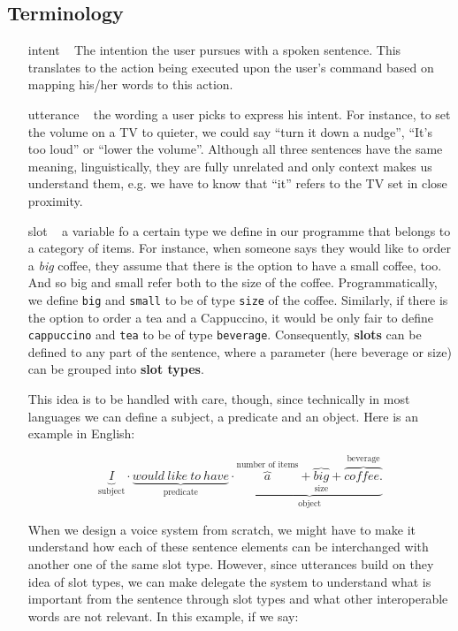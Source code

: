 \subsection{Terminology} 
\begin{itemize}
	\item[intent]~\label{intents} The intention the user pursues with a spoken sentence. This translates to the action being executed upon the user's command based on mapping his/her words to this action.
	
	\item[utterance]~\label{utterances} the wording a user picks to express his intent. For instance, to set the volume on a TV to quieter, we could say ``turn it down a nudge'', ``It's too loud'' or ``lower the volume''. Although all three sentences have the same meaning, linguistically, they are fully unrelated and only context makes us understand them, e.g. we have to know that ``it'' refers to the TV set in close proximity.
	
	\item [slot]~\label{slots} a variable fo a certain type we define in our programme that belongs to a category of items. For instance, when someone says they would like to order a \textit{big} coffee, they assume that there is the option to have a small coffee, too. And so big and small refer both to the size of the coffee. Programmatically, we define \lstinline|big| and \lstinline|small| to be of type \lstinline|size| of the coffee. Similarly, if there is the option to order a tea and a Cappuccino, it would be only fair to define \lstinline|cappuccino| and \lstinline|tea| to be of type \lstinline|beverage|. Consequently, \textbf{slots} can be defined to any part of the sentence, where a parameter (here beverage or size) can be grouped into \textbf{slot types}. 

	
	This idea is to be handled with care, though, since technically in most languages we can define a subject, a predicate and an object. Here is an example in English:
	
	
	\[
	\underbrace{I}_\text{subject} \cdot
	\underbrace{would \ like  \ to \ have}_\text{predicate} \cdot
	\underbrace{
		\overbrace{{a}}^\text{number of items} +		
		\overbrace{big}_\text{size} +
		\overbrace{coffee.}^\text{beverage}
	}_\text{object} 
	\]
	
	When we design a voice system from scratch, we might have to make it understand how each of these sentence elements can be interchanged with another one of the same slot type. However, since utterances build on they idea of slot types, we can make delegate the system to understand what is important from the sentence through slot types and what other interoperable words are not relevant. In this example, if we say:
	


\end{itemize}
